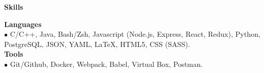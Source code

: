 \documentclass[11pt]{article}
\newcommand{\sectionheader}[1]{\noindent \textbf{\large #1}}
\newenvironment{sectionbody}{\begin{adjustwidth}{6mm}{}}{\end{adjustwidth}}
\begin{document}
\vspace{2mm}

\sectionheader{Skills}
\begin{sectionbody}
{\bf Languages} \\
$\bullet$ C/C++, Java, Bash/Zsh, Javascript (Node.js, Express, React, Redux), Python, PostgreSQL, JSON, YAML, \LaTeX, HTML5, CSS (SASS). \\
{\bf Tools} \\
$\bullet$ Git/Github, Docker, Webpack, Babel, Virtual Box, Postman.
\end{sectionbody}
\end{document}
